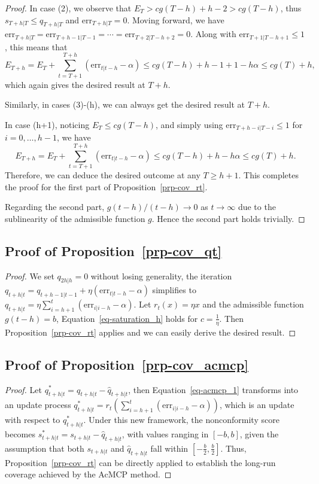\documentclass[
  11pt,
  a4paper,
]{article}
\theoremstyle{plain}
\theoremstyle{remark}
\begin{document}
\begin{proof}
In case (2), we observe that \(E_T > cg(T-h)+h-2 > cg(T-h)\), thus
\(s_{T+h|T} \leq q_{T+h|T}\) and \(\mathrm{err}_{T+h|T} = 0\). Moving
forward, we have
\(\mathrm{err}_{T+h|T} = \mathrm{err}_{T+h-1|T-1} = \cdots = \mathrm{err}_{T+2|T-h+2} = 0\).
Along with \(\mathrm{err}_{T+1|T-h+1} \leq 1\), this means that \[
E_{T+h} = E_T+\sum_{t=T+1}^{T+h}(\mathrm{err}_{t|t-h}-\alpha) \leq cg(T-h)+h-1+1-h\alpha \leq cg(T)+h,
\] which again gives the desired result at \(T+h\).

Similarly, in cases (3)-(h), we can always get the desired result at
\(T+h\).

In case (h+1), noticing \(E_T \leq cg(T-h)\), and simply using
\(\mathrm{err}_{T+h-i|T-i} \leq 1\) for \(i=0,\ldots,h-1\), we have \[
E_{T+h} = E_T+\sum_{t=T+1}^{T+h}(\mathrm{err}_{t|t-h}-\alpha) \leq cg(T-h)+h-h\alpha \leq cg(T)+h.
\] Therefore, we can deduce the desired outcome at any \(T \geq h+1\).
This completes the proof for the first part of
Proposition~\ref{prp-cov_rt}.

Regarding the second part, \(g(t-h)/(t-h) \rightarrow 0\) as
\(t \rightarrow \infty\) due to the sublinearity of the admissible
function \(g\). Hence the second part holds trivially.
\end{proof}

\subsection{\texorpdfstring{Proof of
Proposition~\ref{prp-cov_qt}}{Proof of Proposition~}}\label{sec-proof_cov_qt}

\begin{proof}
We set \(q_{2h|h}=0\) without losing generality, the iteration
\(q_{t+h|t}=q_{t+h-1|t-1}+\eta (\mathrm{err}_{t|t-h}-\alpha)\)
simplifies to
\(q_{t+h|t}=\eta \sum_{i=h+1}^{t}(\mathrm{err}_{i|i-h}-\alpha)\). Let
\(r_t(x) = \eta x\) and the admissible function \(g(t-h) = b\),
Equation~\ref{eq-saturation_h} holds for \(c=\frac{1}{\eta}\). Then
Proposition~\ref{prp-cov_rt} applies and we can easily derive the
desired result.
\end{proof}

\subsection{\texorpdfstring{Proof of
Proposition~\ref{prp-cov_acmcp}}{Proof of Proposition~}}\label{sec-proof_cov_acmcp}

\begin{proof}
Let \(q_{t+h|t}^{*}=q_{t+h|t}-\hat{q}_{t+h|t}\), then
Equation~\ref{eq-acmcp_1} transforms into an update process
\(q_{t+h|t}^{*}=r_t\left(\sum_{i=h+1}^t (\mathrm{err}_{i|i-h}-\alpha)\right)\),
which is an update with respect to \(q_{t+h|t}^{*}\). Under this new
framework, the nonconformity score becomes
\(s_{t+h|t}^{*}=s_{t+h|t}-\hat{q}_{t+h|t}\), with values ranging in
\([-b,b]\), given the assumption that both \(s_{t+h|t}\) and
\(\hat{q}_{t+h|t}\) fall within \([-\frac{b}{2},\frac{b}{2}]\). Thus,
Proposition~\ref{prp-cov_rt} can be directly applied to establish the
long-run coverage achieved by the AcMCP method.
\end{proof}
\end{document}
